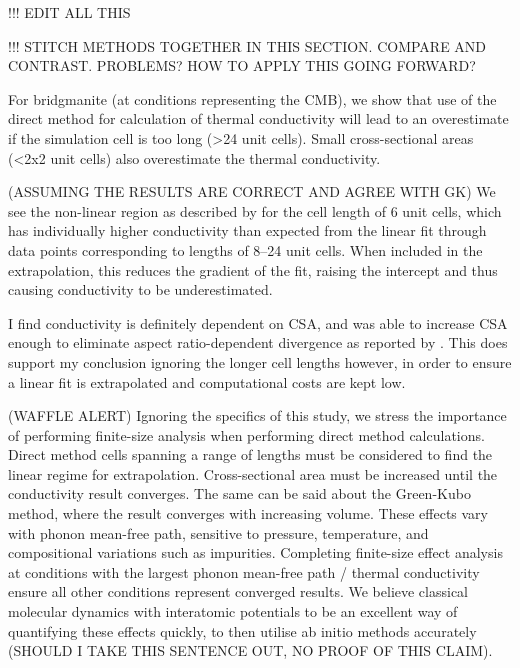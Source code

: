 !!! EDIT ALL THIS

!!! STITCH METHODS TOGETHER IN THIS SECTION. COMPARE AND CONTRAST. PROBLEMS? HOW TO APPLY THIS GOING FORWARD?

For bridgmanite (at conditions representing the CMB), we show that use of the direct method for calculation of thermal conductivity will lead to an overestimate if the simulation cell is too long (\textgreater 24 unit cells). Small cross-sectional areas (\textless 2x2 unit cells) also overestimate the thermal conductivity. %

(ASSUMING THE RESULTS ARE CORRECT AND AGREE WITH GK) We see the non-linear region as described by \citet{Sellan2010} for the cell length of 6 unit cells, which has individually higher conductivity than expected from the linear fit through data points corresponding to lengths of 8--24 unit cells. When included in the extrapolation, this reduces the gradient of the fit, raising the intercept and thus causing conductivity to be underestimated. %

I find conductivity is definitely dependent on CSA, and was able to increase CSA enough to eliminate aspect ratio-dependent divergence as reported by \citet{Hu2011}. This does support my conclusion ignoring the longer cell lengths however, in order to ensure a linear fit is extrapolated and computational costs are kept low. 

(WAFFLE ALERT) Ignoring the specifics of this study, we stress the importance of performing finite-size analysis when performing direct method calculations.  Direct method cells spanning a range of lengths must be considered to find the linear regime for extrapolation. Cross-sectional area must be increased until the conductivity result converges. The same can be said about the Green-Kubo method, where the result converges with increasing volume. These effects vary with phonon mean-free path, sensitive to pressure, temperature, and compositional variations such as impurities. Completing finite-size effect analysis at conditions with the largest phonon mean-free path / thermal conductivity ensure all other conditions represent converged results. We believe classical molecular dynamics with interatomic potentials to be an excellent way of quantifying these effects quickly, to then utilise ab initio methods accurately (SHOULD I TAKE THIS SENTENCE OUT, NO PROOF OF THIS CLAIM).
